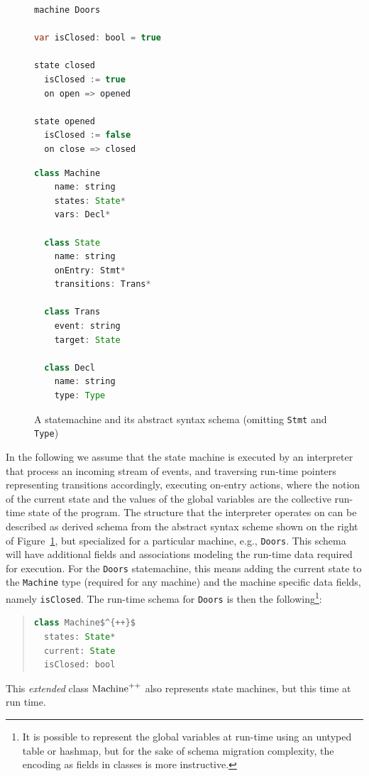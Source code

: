 \documentclass[english,submission]{programming}
\begin{document}
\begin{figure}[t]
\centering
\begin{minipage}[t]{0.4\textwidth}
\begin{lstlisting}[language=java,morekeywords={machine,on,state,var}]
machine Doors

var isClosed: bool = true

state closed
  isClosed := true
  on open => opened

state opened
  isClosed := false
  on close => closed
\end{lstlisting}
\end{minipage}
\hspace*{5pt}\vline
\begin{minipage}[t]{0.4\textwidth}
\begin{lstlisting}[language=java,morekeywords={on}]
  class Machine
    name: string
    states: State*
    vars: Decl*

  class State
    name: string
    onEntry: Stmt*
    transitions: Trans*

  class Trans
    event: string
    target: State

  class Decl
    name: string
    type: Type
  \end{lstlisting}
\end{minipage}
\caption{A statemachine and its abstract syntax schema (omitting \lstinline{Stmt} and \lstinline{Type})}
\label{LST:statemachines}
\end{figure}

In the following we assume that the state machine is executed by an interpreter that process an incoming stream of events, and traversing run-time pointers representing transitions accordingly, executing on-entry actions, where the notion of the current state and the values of the global variables are the collective run-time state of the program. The structure that the interpreter operates on can be described as derived  schema from the abstract syntax scheme shown on the right of Figure~\ref{LST:statemachines}, but specialized for a particular machine, e.g., \lstinline{Doors}.
This schema will have additional fields and associations modeling the run-time data required for execution. For the \lstinline{Doors} statemachine, this means adding the current state to the \lstinline{Machine} type (required for any machine) and the machine specific data fields, namely \lstinline{isClosed}. The run-time schema for \lstinline{Doors} is then the following\footnote{It is possible to represent the global variables at run-time using an untyped table or hashmap, but for the sake of schema migration complexity, the encoding as fields in classes is more instructive.}:
\begin{quote}
\begin{lstlisting}[language=java,morekeywords={on},mathescape=true]
class Machine$^{++}$
  states: State*
  current: State
  isClosed: bool
\end{lstlisting}
\end{quote}
This \textit{extended} class $\text{\lstinline{Machine}}^{++}$ also represents state machines, but this time at run time.
\end{document}
